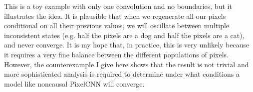 \documentclass[11pt, a4paper, openany]{book}
\begin{document}
This is a toy example with only one convolution and no boundaries, but it illustrates the idea. It is plausible that when we regenerate all our pixels conditional on all their previous values, we will oscillate between multiple inconsistent states (e.g. half the pixels are a dog and half the pixels are a cat), and never converge. It is my hope that, in practice, this is very unlikely because it requires a very fine balance between the different populations of pixels. However, the counterexample I give here shows that the result is not trivial and more sophisticated analysis is required to determine under what conditions a model like noncausal PixelCNN will converge.

\backmatter




\printindex
\end{document}
